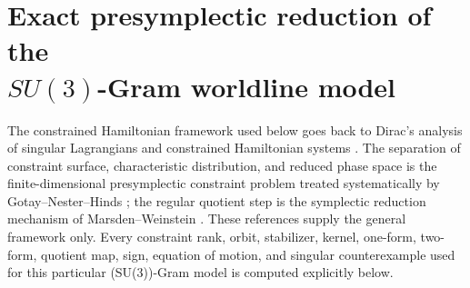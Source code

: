 \begingroup
\def\J{\mathcal J_2}
\def\V{\mathscr V}
\def\Psd{\mathcal P_2}
\def\Ppos{\mathcal P_2^{++}}
\def\Nfuture{\mathcal N_+^\times}
\def\rankC{\operatorname{rank}_{\mathbb C}}
\def\dd{\mathrm d}
\def\SpanR{\operatorname{span}_{\mathbb R}}

\section[Exact presymplectic reduction of the SU(3)-Gram worldline model]
{Exact presymplectic reduction of the\\
\texorpdfstring{$SU(3)$}{SU(3)}-Gram worldline model}
\label{wpr:sec:worldline-reduction}

The constrained Hamiltonian framework used below goes back to Dirac's
analysis of singular Lagrangians and constrained Hamiltonian systems
\cite{Dirac1950}.  The separation of constraint surface, characteristic
distribution, and reduced phase space is the finite-dimensional
presymplectic constraint problem treated systematically by
Gotay--Nester--Hinds \cite{GotayNesterHinds1978}; the regular quotient
step is the symplectic reduction mechanism of Marsden--Weinstein
\cite{MarsdenWeinstein1974}.  These references supply the general
framework only.  Every constraint rank, orbit, stabilizer, kernel,
one-form, two-form, quotient map, sign, equation of motion, and singular
counterexample used for this particular (SU(3))-Gram model is computed
explicitly below.

